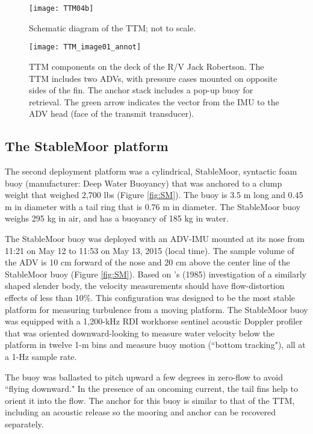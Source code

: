 \begin{figure}[t]
  \centering
  \texttt{[image: TTM04b]}
  \caption{Schematic diagram of the TTM; not to scale.}
  \label{fig:ttm:diagram}
\end{figure}

\begin{figure}[t]
  \centering
  \texttt{[image: TTM\_image01\_annot]}
  \caption{TTM components on the deck of the R/V Jack Robertson. The TTM includes two ADVs, with pressure cases mounted on opposite sides of the fin. The anchor stack includes a pop-up buoy for retrieval. The green arrow indicates the vector from the IMU to the ADV head (face of the transmit transducer). }
  \label{fig:ttm:photo}
\end{figure}

\subsection{The StableMoor platform}

The second deployment platform was a cylindrical, StableMoor, syntactic foam buoy (manufacturer: Deep Water Buoyancy) that was anchored to a clump weight that weighed 2,700 lbs (Figure \ref{fig:SM}). The buoy is 3.5 m long and 0.45 m in diameter with a tail ring that is 0.76 m in diameter. The StableMoor buoy weighs 295 kg in air, and has a buoyancy of 185 kg in water. 

The StableMoor buoy was deployed with an ADV-IMU mounted at its nose from 11:21 on May 12 to 11:53 on May 13, 2015 (local time). The sample volume of the ADV is 10 cm forward of the nose and 20 cm above the center line of the StableMoor buoy (Figure \ref{fig:SM}). Based on \citeauthor{Wyngaard++1985}'s (1985) investigation of a similarly shaped slender body, the velocity measurements should have flow-distortion effects of less than 10\%. This configuration was designed to be the most stable platform for measuring turbulence from a moving platform. The StableMoor buoy was equipped with a 1,200-kHz RDI workhorse sentinel acoustic Doppler profiler that was oriented downward-looking to measure water velocity below the platform in twelve 1-m bins and measure buoy motion (``bottom tracking"), all at a 1-Hz sample rate. 

The buoy was ballasted to pitch upward a few degrees in zero-flow to avoid ``flying downward." In the presence of an oncoming current, the tail fins help to orient it into the flow. The anchor for this buoy is similar to that of the TTM, including an acoustic release so the mooring and anchor can be recovered separately.

